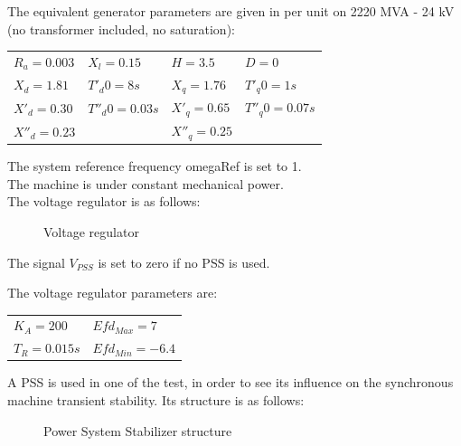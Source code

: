 \documentclass[a4paper, 12pt]{report}
\begin{document}
The equivalent generator parameters are given in per unit on 2220 MVA - 24 kV (no transformer included, no saturation):
\begin{center}
\begin{tabular}{l|l|l|l}
   $R_a=0.003$ & $X_l=0.15$ & $H=3.5$ & $D=0$ \\
   $X_d=1.81$ & $T'_d0=8s$ & $X_q=1.76$ & $T'_q0=1s$ \\
   $X'_d=0.30$ & $T''_d0=0.03s$ & $X'_q=0.65$ & $T''_q0=0.07s$ \\
   $X''_d=0.23$ & & $X''_q=0.25$ &  \\
\end{tabular}
\end{center}

The system reference frequency omegaRef is set to 1.\\
The machine is under constant mechanical power. \\
The voltage regulator is as follows:
\begin{figure}[H]
\centering
{}
\caption{Voltage regulator}
\end{figure}

The signal $V_{PSS}$ is set to zero if no PSS is used.


The voltage regulator parameters are:
\begin{center}
\begin{tabular}{l|l}
   $K_A=200$ & $Efd_{Max}=7$  \\
   $T_R=0.015s$ & $Efd_{Min}=-6.4$   \\
\end{tabular}
\end{center}

A PSS is used in one of the test, in order to see its influence on the synchronous machine transient stability. Its structure is as follows:
\begin{figure}[H]
\centering
{}
\caption{Power System Stabilizer structure}
\end{figure}
\end{document}
